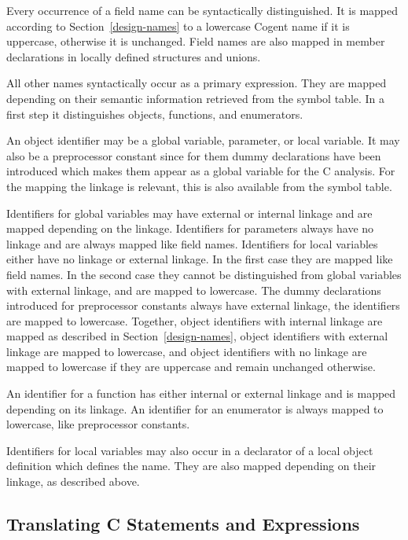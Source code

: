 Every occurrence of a field name can be syntactically distinguished. It is mapped according to 
Section~\ref{design-names} to a lowercase Cogent name if it is uppercase, otherwise it is unchanged.
Field names are also mapped in member declarations in locally defined structures and unions.

All other names syntactically occur as a primary expression. They are mapped depending on their semantic
information retrieved from the symbol table. In a first step it distinguishes objects, functions, 
and enumerators.

An object identifier may be a global variable, parameter, or local variable. It may also be a preprocessor 
constant since for them dummy declarations have been introduced which makes them appear as a global variable
for the C analysis. For the mapping the linkage is relevant, this is also available from the symbol table.

Identifiers for global variables may have external or internal linkage and are mapped depending on the
linkage. Identifiers for parameters always have no linkage and are always mapped like field names. Identifiers
for local variables either have no linkage or external linkage. In the first case they are mapped like
field names. In the second case they cannot be distinguished from global variables with external linkage,
and are mapped to lowercase. The dummy declarations introduced for preprocessor constants
always have external linkage, the identifiers are mapped to lowercase. Together, object identifiers with 
internal linkage are mapped as described in Section~\ref{design-names}, object identifiers with external
linkage are mapped to lowercase, and object identifiers with no linkage are mapped to lowercase if they are
uppercase and remain unchanged otherwise.

An identifier for a function has either internal or external linkage and is mapped depending on its linkage.
An identifier for an enumerator is always mapped to lowercase, like preprocessor constants.

Identifiers for local variables may also occur in a declarator of a local object definition which defines 
the name. They are also mapped depending on their linkage, as described above.

\subsection{Translating C Statements and Expressions}
\label{impl-ccode-cstats}

